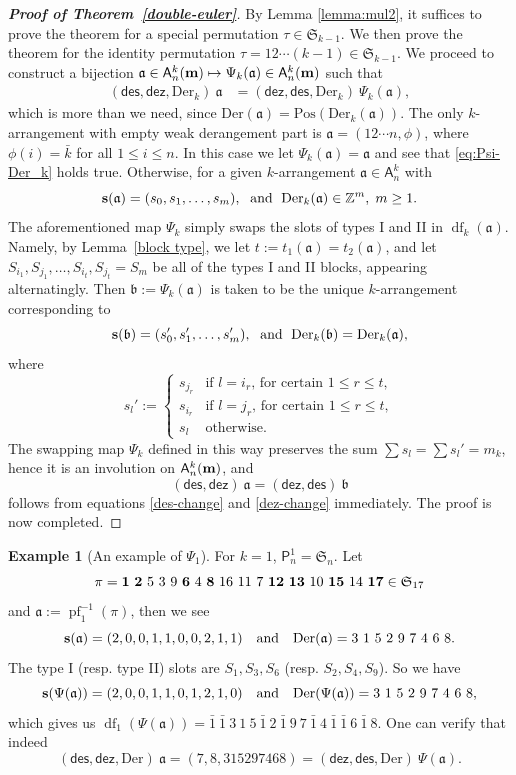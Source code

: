 \documentclass[12pt]{amsart} %
\numberwithin{equation}{section}
\theoremstyle{plain}
\theoremstyle{definition}
\newtheorem{example}[theorem]{Example}
\newcommand{\Z}{\mathbb{Z}}
\newcommand\A{\mathsf{A}}
\renewcommand\P{\mathsf{P}}
\def\dez{\mathsf{dez}}
\def\Der{\mathrm{Der}}
\def\Pos{\mathrm{Pos}}
\def\des{\mathsf{des}}
\def\S{\mathfrak{S}}
\def\a{\mathfrak{a}}
\def\b{\mathfrak{b}}
\def\s{\operatorname{{\bf s}}}
\def\df{\operatorname{df}}
\def\pf{\operatorname{pf}}
\def\s{\operatorname{{\bf s}}}
\def\neg#1{{{{\bar#1}}}}
\begin{document}
\begin{proof}[\bf Proof of Theorem~\ref{double-euler}]
By Lemma \ref{lemma:mul2}, it suffices to prove the theorem for a special permutation $\tau\in\S_{k-1}$. We then prove the theorem for the identity permutation $\tau=12\cdots (k-1)\in \S_{k-1}$. We proceed to construct a bijection $\a\in\A_n^k({\bf m})\mapsto \Psi_k(\a)\in\A_n^k({\bf m})$ such that
\begin{align}\label{eq:Psi-Der_k}
(\des,\dez,\Der_k)~\a &= (\dez,\des,\Der_k)~\Psi_k(\a),
\end{align}
which is more than we need, since $\Der(\a)=\Pos(\Der_k(\a))$.
The only $k$-arrangement with empty weak derangement part is $\a=(12\cdots n,\phi)$, where $\phi(i)=\neg k$ for all $1\le i\le n$. In this case we let $\Psi_k(\a)=\a$ and see that \eqref{eq:Psi-Der_k} holds true. Otherwise, for a given $k$-arrangement $\a\in\A_n^k$ with
$$\s(\a)=(s_0,s_1,\ldots,s_m), \; \text{ and }\; \Der_k(\a)\in\Z^m, \; m\ge 1.$$
The aforementioned map $\Psi_k$ simply swaps the slots of types I and II in $\df_k(\a)$. Namely, by Lemma~\ref{block type}, we let $t:=t_1(\a)=t_2(\a)$, and let $S_{i_1},S_{j_1},\ldots,S_{i_t},S_{j_t}=S_m$ be all of the types I and II blocks, appearing alternatingly. Then $\b:=\Psi_k(\a)$ is taken to be the unique $k$-arrangement corresponding to
$$\s(\b)=(s_0',s_1',\ldots,s_m'),\; \text{ and }\; \Der_k(\b)=\Der_k(\a),$$
where
$$s_l':=\begin{cases}
s_{j_r} & \text{if $l=i_r$, for certain $1\le r\le t$},\\
s_{i_r} & \text{if $l=j_r$, for certain $1\le r\le t$},\\
s_l & \text{otherwise.}
\end{cases}$$
The swapping map $\Psi_k$ defined in this way preserves the sum $\sum s_l=\sum s_l'=m_k$, hence it is an involution on $\A_n^k({\bf m})$, and $$(\des,\dez)~\a = (\dez,\des)~\mathfrak{b}$$ follows from equations \eqref{des-change} and \eqref{dez-change} immediately. The proof is now completed.
\end{proof}

\begin{example}[An example of $\Psi_1$]
For $k=1$, $\P_n^1=\S_n$. Let 
$$\pi={\bf 1~2}~5~3~9~{\bf6}~4~{\bf 8}~16~11~7~{\bf 12~13}~10~{\bf15}~14~{\bf 17}\in\S_{17}$$ and $\a:=\pf_1^{-1}(\pi)$, then we see
$$\s(\a)=(2,0,0,1,1,0,0,2,1,1)\quad \text{and} \quad \Der(\a)=3~1~5~2~9~7~4~6~8. $$
The type I (resp. type II) slots are $S_1, S_3, S_6$ (resp. $S_2, S_4, S_9$). So we have
$$\s(\Psi(\a))=(2,0,0,1,1,0,1,2,1,0)\quad \text{and} \quad\Der(\Psi(\a))=3~1~5~2~9~7~4~6~8, $$
which gives us $\df_1(\Psi(\a))=\neg 1~\neg 1~3~1~5~\neg 1~2~\neg 1~9~7~\neg 1~4~\neg 1~\neg 1~6~\neg 1~8$. One can verify that indeed
$$(\des, \dez, \Der)~\a = (7, 8, 315297468) = (\dez, \des, \Der)~\Psi(\a).$$
\end{example}
\end{document}
